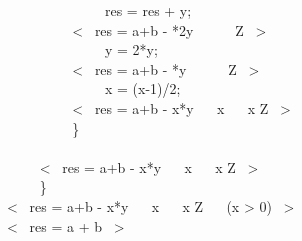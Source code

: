 \documentclass[a4paper]{article}
\begin{document}
~~~~ ~~~~ ~~~~ res = res + y; \\
~~~~ ~~~~ <~ res = a+b - *2y ~\land~   ~\land~  \in \mathbb Z ~> \\
~~~~ ~~~~ ~~~~ y = 2*y; \\
~~~~ ~~~~ <~ res = a+b - *y ~\land~   ~\land~  \in \mathbb Z ~> \\
~~~~ ~~~~ ~~~~ x = (x-1)/2; \\
~~~~ ~~~~ <~ res = a+b - x*y ~\land~ x  ~\land~ x \in \mathbb Z ~> \\
~~~~ ~~~~ \} \\
\\
~~~~ <~ res = a+b - x*y ~\land~ x  ~\land~ x \in \mathbb Z ~> \\
~~~~ \} \\
<~ res = a+b - x*y ~\land~ x  ~\land~ x \in \mathbb Z ~\land~ \neg (x > 0) ~> \\
<~ res = a + b ~> \\
\)
\end{document}
